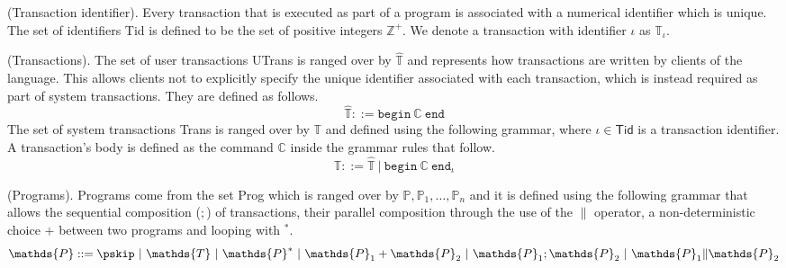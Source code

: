  (Transaction identifier). Every transaction that is executed as part of a program is associated with a numerical identifier which is unique. The set of identifiers \textsf{Tid} is defined to be the set of positive integers $\mathds{Z}^+$. We denote a transaction with identifier $\iota$ as $\mathds{T}_\iota$.

 (Transactions). The set of user transactions \textsf{UTrans} is ranged over by $\hat{\mathds{T}}$ and represents how transactions are written by clients of the language. This allows clients not to explicitly specify the unique identifier associated with each transaction, which is instead required as part of system transactions. They are defined as follows.
\[
	\hat{\mathds{T}} ::=
		\mathtt{begin}\ \mathds{C}\ \mathtt{end}
\]
The set of system transactions \textsf{Trans} is ranged over by $\mathds{T}$ and defined using the following grammar, where $\iota \in \mathsf{Tid}$ is a transaction identifier. A transaction's body is defined as the command $\mathds{C}$ inside the grammar rules that follow.
\[
	\mathds{T} ::=
		\hat{\mathds{T}}\
		|\ \mathtt{begin}\ \mathds{C}\ \mathtt{end}_\iota
\]

 (Programs). Programs come from the set \textsf{Prog} which is ranged over by $\mathds{P}, \mathds{P}_1, \ldots, \mathds{P}_n$ and it is defined using the following grammar that allows the sequential composition ($;$) of transactions, their parallel composition through the use of the $\|$ operator, a non-deterministic choice $+$ between two programs and looping with $^*$.
\[
	\mathds{P} ::=
		\pskip\
		|\ \mathds{T}\
		|\ \mathds{P}^*\
		|\ \mathds{P}_1 + \mathds{P}_2\
		|\ \mathds{P}_1; \mathds{P}_2\
		|\ \mathds{P}_1 \| \mathds{P}_2
\]